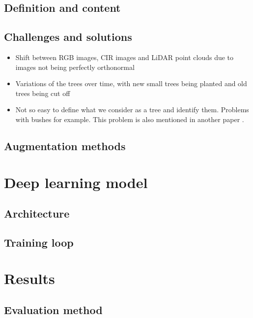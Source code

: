 \documentclass[
]{report}
\providecommand{\tightlist}{%
  \setlength{\itemsep}{0pt}\setlength{\parskip}{0pt}}\usepackage{longtable,booktabs,array}
\begin{document}
\section{Definition and content}\label{definition-and-content}

\section{Challenges and solutions}\label{challenges-and-solutions}

\begin{itemize}
\tightlist
\item
  Shift between RGB images, CIR images and LiDAR point clouds due to
  images not being perfectly orthonormal
\item
  Variations of the trees over time, with new small trees being planted
  and old trees being cut off
\item
  Not so easy to define what we consider as a tree and identify them.
  Problems with bushes for example. This problem is also mentioned in
  another paper \autocite{DeepForestBefore}.
\end{itemize}

\section{Augmentation methods}\label{augmentation-methods}

\chapter{Deep learning model}\label{deep-learning-model}

\section{Architecture}\label{architecture}

\section{Training loop}\label{training-loop}

\chapter{Results}\label{results}

\section{Evaluation method}\label{evaluation-method}
\end{document}
